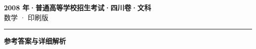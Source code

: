 \documentclass[zihao=5, a4paper]{ctexart}
\begin{document}
\begin{center}
  {\Large\bfseries 2008 年·普通高等学校招生考试·四川卷·文科}\\[4pt]
  {\large 数学 · 印刷版}
\end{center}
\medskip
{}

\par\bigskip\hrule\bigskip
{}
\begin{center}{\large\bfseries 参考答案与详细解析}\end{center}
\smallskip

\end{document}
